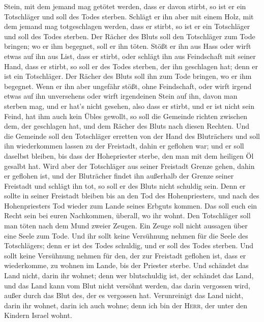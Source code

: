 Stein, mit dem jemand mag getötet werden, dass er davon stirbt, so ist
er ein Totschläger und soll des Todes sterben.  Schlägt
er ihn aber mit einem Holz, mit dem jemand mag totgeschlagen werden,
dass er stirbt, so ist er ein Totschläger und soll des Todes sterben.
 Der Rächer des Bluts soll den Totschläger zum Tode
bringen; wo er ihm begegnet, soll er ihn töten.  Stößt er
ihn aus Hass oder wirft etwas auf ihn aus List, dass er stirbt,
 oder schlägt ihn aus Feindschaft mit seiner Hand, dass
er stirbt, so soll er des Todes sterben, der ihn geschlagen hat; denn er
ist ein Totschläger. Der Rächer des Bluts soll ihn zum Tode bringen, wo
er ihm begegnet.  Wenn er ihn aber ungefähr stößt, ohne
Feindschaft, oder wirft irgend etwas auf ihn unversehens 
oder wirft irgendeinen Stein auf ihn, davon man sterben mag, und er
hat's nicht gesehen, also dass er stirbt, und er ist nicht sein Feind,
hat ihm auch kein Übles gewollt,  so soll die Gemeinde
richten zwischen dem, der geschlagen hat, und dem Rächer des Bluts nach
diesen Rechten.  Und die Gemeinde soll den Totschläger
erretten von der Hand des Bluträchers und soll ihn wiederkommen lassen
zu der Freistadt, dahin er geflohen war; und er soll daselbst bleiben,
bis dass der Hohepriester sterbe, den man mit dem heiligen Öl gesalbt
hat.  Wird aber der Totschläger aus seiner Freistadt
Grenze gehen, dahin er geflohen ist,  und der Bluträcher
findet ihn außerhalb der Grenze seiner Freistadt und schlägt ihn tot, so
soll er des Bluts nicht schuldig sein.  Denn er sollte in
seiner Freistadt bleiben bis an den Tod des Hohenpriesters, und nach des
Hohenpriesters Tod wieder zum Lande seines Erbguts kommen.
 Das soll euch ein Recht sein bei euren Nachkommen,
überall, wo ihr wohnt.  Den Totschläger soll man töten
nach dem Mund zweier Zeugen. Ein Zeuge soll nicht aussagen über eine
Seele zum Tode.  Und ihr sollt keine Versühnung nehmen
für die Seele des Totschlägers; denn er ist des Todes schuldig, und er
soll des Todes sterben.  Und sollt keine Versühnung
nehmen für den, der zur Freistadt geflohen ist, dass er wiederkomme, zu
wohnen im Lande, bis der Priester sterbe.  Und schändet
das Land nicht, darin ihr wohnet; denn wer blutschuldig ist, der
schändet das Land, und das Land kann vom Blut nicht versöhnt werden, das
darin vergossen wird, außer durch das Blut des, der es vergossen hat.
 Verunreinigt das Land nicht, darin ihr wohnet, darin ich
auch wohne; denn ich bin der \textsc{Herr}, der unter den Kindern Israel
wohnt.

